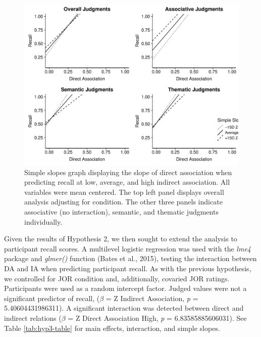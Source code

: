 \documentclass[english,,man]{apa6}
\begin{document}
\begin{figure}
\centering
\includegraphics{max_buch_JOL_files/figure-latex/hyp3graph-1.pdf}
\caption{\label{fig:hyp3graph}Simple slopes graph displaying the slope of direct association when predicting recall at low, average, and high indirect association. All variables were mean centered. The top left panel displays overall analysis adjusting for condition. The other three panels indicate associative (no interaction), semantic, and thematic judgments individually.}
\end{figure}

Given the results of Hypothesis 2, we then sought to extend the analysis to participant recall scores. A multilevel logistic regression was used with the \emph{lme4} package and \emph{glmer()} function (Bates et al., 2015), testing the interaction between DA and IA when predicting participant recall. As with the previous hypothesis, we controlled for JOR condition and, additionally, covaried JOR ratings. Participants were used as a random intercept factor. Judged values were not a significant predictor of recall, (\(\beta\) = Z Indirect Association, \emph{p} = 5.40604431986311). A significant interaction was detected between direct and indirect relations (\(\beta\) = Z Direct Association High, \emph{p} = 6.83585885606031). See Table \ref{tab:hyp3-table} for main effects, interaction, and simple slopes.
\end{document}
